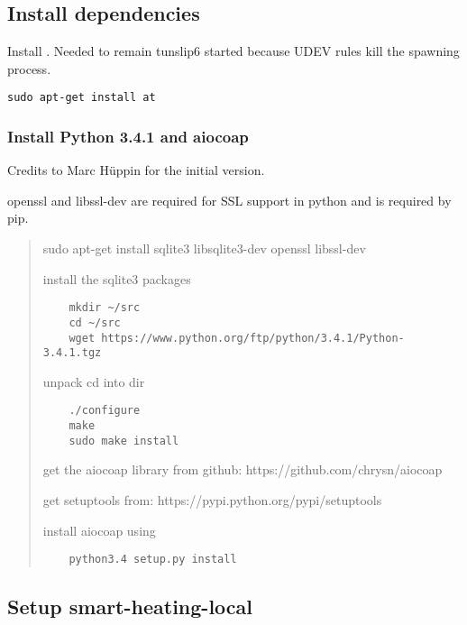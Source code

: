 \subsection{Install dependencies}\label{install-dependencies}

Install . Needed to remain tunslip6 started because UDEV
rules kill the spawning process.

\begin{verbatim}
sudo apt-get install at
\end{verbatim}

\subsubsection{Install Python 3.4.1 and	aiocoap}\label{install-python-3.4.1-and-aiocoap}

Credits to Marc Hüppin for the initial version.

openssl and libssl-dev are required for SSL support in python and is
required by pip.

\begin{quote}
	sudo apt-get install sqlite3 libsqlite3-dev openssl libssl-dev
	
	install the sqlite3 packages
	
	\begin{verbatim}
	mkdir ~/src
	cd ~/src
	wget https://www.python.org/ftp/python/3.4.1/Python-3.4.1.tgz
	\end{verbatim}
	
	unpack cd into dir
	
	\begin{verbatim}
	./configure
	make
	sudo make install
	\end{verbatim}
	
	get the aiocoap library from github: https://github.com/chrysn/aiocoap
	
	get setuptools from: https://pypi.python.org/pypi/setuptools
	
	install aiocoap using
	
	\begin{verbatim}
	python3.4 setup.py install
	\end{verbatim}
\end{quote}

\subsection{Setup smart-heating-local}\label{setup-smart-heating-local}

